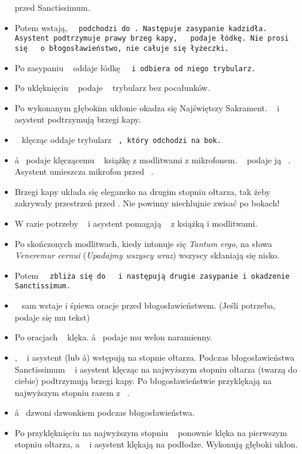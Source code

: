 \begin{itemize}
	      przed Sanctissimum.
	\item Potem wstają, \tt~ podchodzi do \cc. Następuje zasypanie
	      kadzidła. Asystent podtrzymuje prawy brzeg kapy, \cc~ podaje łódkę. Nie
	      prosi się \ii~ o błogosławieństwo, nie całuje się łyżeczki.
	\item  Po zasypaniu \cc~ oddaje łódkę \tt~ i odbiera od niego trybularz.
	\item Po uklęknięciu \cc~ podaje \ii~ trybularz bez pocałunków.
	\item Po wykonanym głębokim ukłonie okadza się Najświętszy Sakrament. \cc~ i
	      asystent podtrzymują brzegi kapy.
	\item \cc~ klęcząc oddaje trybularz \tt~, który odchodzi na bok.
	\item \aa~ podaje klęczącemu \cc~ książkę z modlitwami z mikrofonem. \cc~ podaje ją \ii~.
	      Asystent umieszcza mikrofon przed \ii~.
	\item Brzegi kapy układa się elegancko na drugim stopniu ołtarza, tak żeby
	      zakrywały przestrzeń przed \ii. Nie powinny niechlujnie zwisać po
	      bokach!
	\item W razie potrzeby \cc~ i asystent pomagają \ii~ z książką i modlitwami.
	\item Po skończonych modlitwach, kiedy intonuje się \textit{Tantum ergo}, na
	      słowa \textit{Veneremur cernui} (\textit{Upadajmy wszyscy wraz})
	      wszyscy skłaniają się nisko.
	\item Potem \tt~ zbliża się do \cc~ i następują drugie zasypanie i okadzenie
	      Sanctissimum.
	\item \ii~ sam wstaje i śpiewa oracje przed błogosławieństwem. (Jeśli
	      potrzeba, podaje się mu tekst)
	\item  Po oracjach \ii~ klęka. \aa~ podaje mu welon naramienny.
	\item \ii, \cc~ i asystent (lub \aa) wstępują na stopnie ołtarza. Podczas
	      błogosławieństwa Sanctissimum \cc~ i asystent klęcząc na najwyższym
	      stopniu ołtarza (twarzą do ciebie) podtrzymują brzegi kapy. Po błogosławieństwie
	      przyklękają na najwyższym stopniu razem z \ii~.
	\item \aa~ dzwoni dzwonkiem podczas błogosławieństwa.
	\item Po przyklęknięciu na najwyższym stopniu \ii~ ponownie klęka na
	      pierwszym stopniu ołtarza, a \cc~ i asystent klękają na podłodze.
	      Wykonują głęboki ukłon.

\end{itemize}
